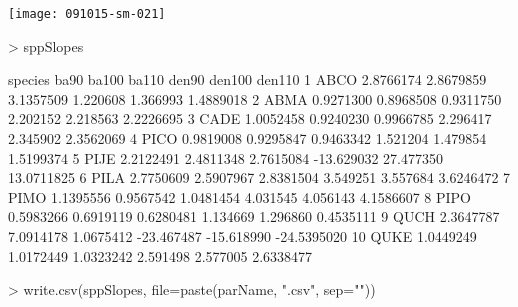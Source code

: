 \documentclass{article}
\begin{document}
\texttt{[image: 091015-sm-021]}
\begin{Schunk}
\begin{Sinput}
>   sppSlopes
\end{Sinput}
\begin{Soutput}
   species      ba90     ba100     ba110      den90     den100      den110
1     ABCO 2.8766174 2.8679859 3.1357509   1.220608   1.366993   1.4889018
2     ABMA 0.9271300 0.8968508 0.9311750   2.202152   2.218563   2.2226695
3     CADE 1.0052458 0.9240230 0.9966785   2.296417   2.345902   2.3562069
4     PICO 0.9819008 0.9295847 0.9463342   1.521204   1.479854   1.5199374
5     PIJE 2.2122491 2.4811348 2.7615084 -13.629032  27.477350  13.0711825
6     PILA 2.7750609 2.5907967 2.8381504   3.549251   3.557684   3.6246472
7     PIMO 1.1395556 0.9567542 1.0481454   4.031545   4.056143   4.1586607
8     PIPO 0.5983266 0.6919119 0.6280481   1.134669   1.296860   0.4535111
9     QUCH 2.3647787 7.0914178 1.0675412 -23.467487 -15.618990 -24.5395020
10    QUKE 1.0449249 1.0172449 1.0323242   2.591498   2.577005   2.6338477
\end{Soutput}
\begin{Sinput}
>     write.csv(sppSlopes, file=paste(parName, ".csv", sep=""))
\end{Sinput}
\end{Schunk}
\end{document}
